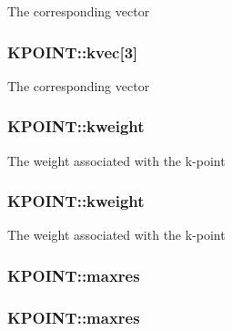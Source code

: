 The corresponding vector \hypertarget{struct_k_p_o_i_n_t_a8baad1682bcc09d06c763ae1052fd102}{
\subsubsection[{kvec}]{ K\-P\-O\-I\-N\-T\-::kvec\mbox{[}3\mbox{]}}}\label{struct_k_p_o_i_n_t_a8baad1682bcc09d06c763ae1052fd102}
The corresponding vector \hypertarget{struct_k_p_o_i_n_t_a115049f8975606cf00d3a5ee43172368}{
\subsubsection[{kweight}]{ K\-P\-O\-I\-N\-T\-::kweight}}\label{struct_k_p_o_i_n_t_a115049f8975606cf00d3a5ee43172368}
The weight associated with the k-\/point \hypertarget{struct_k_p_o_i_n_t_acb575304afded6a65e4c8e6469c205f8}{
\subsubsection[{kweight}]{ K\-P\-O\-I\-N\-T\-::kweight}}\label{struct_k_p_o_i_n_t_acb575304afded6a65e4c8e6469c205f8}
The weight associated with the k-\/point \hypertarget{struct_k_p_o_i_n_t_a916474019d93f710ca843d2946558c90}{
\subsubsection[{maxres}]{ K\-P\-O\-I\-N\-T\-::maxres}}\label{struct_k_p_o_i_n_t_a916474019d93f710ca843d2946558c90}
\hypertarget{struct_k_p_o_i_n_t_a0aa607e829d74e004c03f43b3593a093}{
\subsubsection[{maxres}]{ K\-P\-O\-I\-N\-T\-::maxres}}\label{struct_k_p_o_i_n_t_a0aa607e829d74e004c03f43b3593a093}
